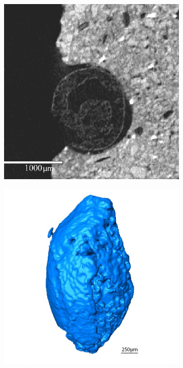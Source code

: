 \documentclass[preprint,10pt,oneside,onecolumn,authoryear]{elsarticle}
\begin{document}
\begin{figure}[!p]
\begin{subfigure}[t]{\textwidth}
		\label{fig:waf83/16-3:33_scan1}
	\end{subfigure}
	\begin{subfigure}[t]{.32\textwidth}
		\includegraphics[width=\textwidth]{Fig_microCT_organic-inclusion-xy.jpg}
		\caption{}
		\label{fig:waf83/16-3:33_scan3}
	\end{subfigure}\hspace{.5em}\hfill
	\begin{subfigure}[t]{.32\textwidth}
		\includegraphics[width=\textwidth]{Fig_microCT_organic-inclusion-volume-rendering-xz.jpg}

\end{subfigure}
\end{figure}
\end{document}
